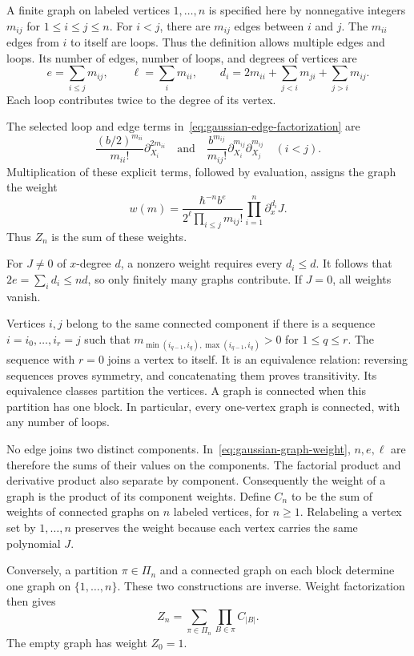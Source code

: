A finite graph on labeled vertices $1,\ldots,n$ is specified here by
nonnegative integers $m_{ij}$ for $1\leq i\leq j\leq n$.
For $i<j$, there are $m_{ij}$ edges between $i$ and $j$.
The $m_{ii}$ edges from $i$ to itself are loops.
Thus the definition allows multiple edges and loops.
Its number of edges, number of loops, and degrees of vertices are
\[
 e=\sum_{i\leq j}m_{ij},\qquad
 \ell=\sum_i m_{ii},\qquad
 d_i=2m_{ii}+\sum_{j<i}m_{ji}+\sum_{j>i}m_{ij}.
\]
Each loop contributes twice to the degree of its vertex.

The selected loop and edge terms in~\eqref{eq:gaussian-edge-factorization} are
\[
 \frac{(b/2)^{m_{ii}}}{m_{ii}!}\partial_{X_i}^{2m_{ii}}
 \quad\text{and}\quad
 \frac{b^{m_{ij}}}{m_{ij}!}\partial_{X_i}^{m_{ij}}\partial_{X_j}^{m_{ij}}
 \quad(i<j).
\]
Multiplication of these explicit terms, followed by evaluation, assigns
the graph the weight
\begin{equation}\label{eq:gaussian-graph-weight}
 w(m)=\frac{\hbar^{-n}b^e}
             {2^\ell\prod_{i\leq j}m_{ij}!}
           \prod_{i=1}^n\partial_x^{d_i}J.
\end{equation}
Thus $Z_n$ is the sum of these weights.

For $J\ne0$ of $x$-degree $d$, a nonzero weight requires every $d_i\leq d$.
It follows that $2e=\sum_i d_i\leq nd$, so only finitely many graphs
contribute. If $J=0$, all weights vanish.

Vertices $i,j$ belong to the same connected component if there is a
sequence $i=i_0,\ldots,i_r=j$ such that
$m_{\min(i_{q-1},i_q),\max(i_{q-1},i_q)}>0$ for $1\leq q\leq r$.
The sequence with $r=0$ joins a vertex to itself.
It is an equivalence relation: reversing sequences proves symmetry,
and concatenating them proves transitivity.
Its equivalence classes partition the vertices.
A graph is connected when this partition has one block.
In particular, every one-vertex graph is connected, with any number of loops.

No edge joins two distinct components.
In~\eqref{eq:gaussian-graph-weight}, $n,e,\ell$ are therefore the sums
of their values on the components.
The factorial product and derivative product also separate by component.
Consequently the weight of a graph is the product of its component weights.
Define $C_n$ to be the sum of weights of connected graphs on $n$ labeled
vertices, for $n\geq1$.
Relabeling a vertex set by $1,\ldots,n$ preserves the weight because
each vertex carries the same polynomial $J$.

Conversely, a partition $\pi\in\Pi_n$ and a connected graph on each
block determine one graph on $\{1,\ldots,n\}$.
These two constructions are inverse. Weight factorization then gives
\begin{equation}\label{eq:gaussian-component-partition}
 Z_n=\sum_{\pi\in\Pi_n}\prod_{B\in\pi}C_{|B|}.
\end{equation}
The empty graph has weight $Z_0=1$.

